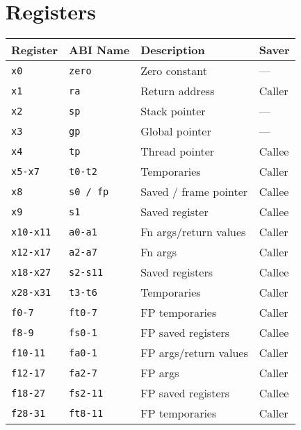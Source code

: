 \section*{Registers}

\begin{tabular} {l | l | l | l} \hline
Register     & ABI Name     & Description           & Saver  \\ \hline
\tt{x0}      & \tt{zero}    & Zero constant         & ---    \\
\tt{x1}      & \tt{ra}      & Return address        & Caller \\
\tt{x2}      & \tt{sp}      & Stack pointer         & ---    \\
\tt{x3}      & \tt{gp}      & Global pointer        & ---    \\
\tt{x4}      & \tt{tp}      & Thread pointer        & Callee \\
\tt{x5-x7}   & \tt{t0-t2}   & Temporaries           & Caller \\
\tt{x8}      & \tt{s0 / fp} & Saved / frame pointer & Callee \\
\tt{x9}      & \tt{s1}      & Saved register        & Callee \\
\tt{x10-x11} & \tt{a0-a1}   & Fn args/return values & Caller \\
\tt{x12-x17} & \tt{a2-a7}   & Fn args               & Caller \\
\tt{x18-x27} & \tt{s2-s11}  & Saved registers       & Callee \\
\tt{x28-x31} & \tt{t3-t6}   & Temporaries           & Caller \\ \hline
\tt{f0-7}    & \tt{ft0-7}   & FP temporaries        & Caller \\
\tt{f8-9}    & \tt{fs0-1}   & FP saved registers    & Callee \\
\tt{f10-11}  & \tt{fa0-1}   & FP args/return values & Caller \\
\tt{f12-17}  & \tt{fa2-7}   & FP args               & Caller \\
\tt{f18-27}  & \tt{fs2-11}  & FP saved registers    & Callee \\
\tt{f28-31}  & \tt{ft8-11}  & FP temporaries        & Caller \\ \hline
\end{tabular}

